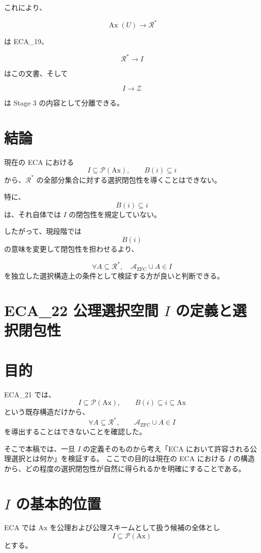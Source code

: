 \documentclass[a4paper,11pt]{article}
\newcommand{\Ax}{\mathrm{Ax}}
\begin{document}
これにより、

\[
\operatorname{Ax}(U)
\to
\mathcal{R}^*
\]

は ECA_19、

\[
\mathcal{R}^*
\to
I
\]

はこの文書、そして

\[
I
\to
\mathcal Z
\]

は Stage 3 の内容として分離できる。

\section{結論}

現在の ECA における
\[
I\subseteq\mathcal{P}(\Ax),
\qquad
B(i)\subseteq i
\]
から、$\mathcal{R}^*$ の全部分集合に対する選択閉包性を導くことはできない。

特に、
\[
B(i)\subseteq i
\]
は、それ自体では $I$ の閉包性を規定していない。

したがって、現段階では
\[
B(i)
\]
の意味を変更して閉包性を担わせるより、

\[
\boxed{
\forall A\subseteq\mathcal{R}^*,
\quad
\mathcal{A}_{\mathrm{ZFC}}\cup A\in I
}
\]
を独立した選択構造上の条件として検証する方が良いと判断できる。

\section{ECA_22 公理選択空間 $I$ の定義と選択閉包性}

\section{目的}

ECA_21 では、
\[
I\subseteq\mathcal{P}(\Ax),
\qquad
B(i)\subseteq i\subseteq\Ax
\]
という既存構造だけから、
\[
\forall A\subseteq\mathcal{R}^*,
\qquad
\mathcal{A}_{\mathrm{ZFC}}\cup A\in I
\]
を導出することはできないことを確認した。

そこで本稿では、一旦 $I$ の定義そのものから考え「ECA において許容される公理選択とは何か」を検証する。
ここでの目的は現在の ECA における $I$ の構造から、どの程度の選択閉包性が自然に得られるかを明確にすることである。

\section{$I$ の基本的位置}

ECA では $\Ax$ を公理および公理スキームとして扱う候補の全体とし
\[
I\subseteq\mathcal{P}(\Ax)
\]
とする。
\end{document}
